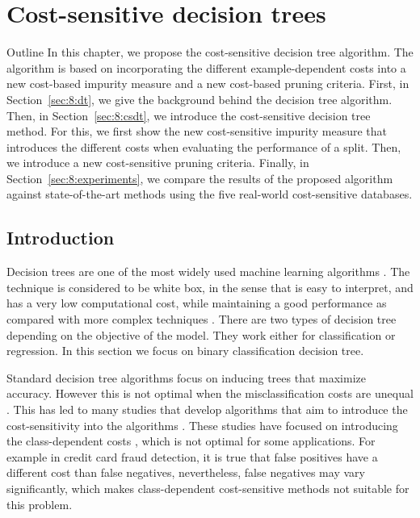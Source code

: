 \chapter{Cost-sensitive decision trees}\label{ch:8}

\begin{remark}{Outline}
In this chapter, we propose the cost-sensitive decision tree algorithm. The algorithm is 
based on incorporating the different example-dependent costs into a new cost-based impurity measure 
and a new cost-based pruning criteria. First, in Section~\ref{sec:8:dt}, we give the background 
behind the decision tree algorithm. Then, in Section~\ref{sec:8:csdt}, we introduce the 
cost-sensitive decision tree method. For this, we first show the new cost-sensitive impurity 
measure that introduces the different costs when evaluating the performance of a split. Then, we 
introduce a new cost-sensitive pruning criteria. Finally, in Section~\ref{sec:8:experiments}, we 
compare the results of the proposed algorithm against state-of-the-art methods using the five 
real-world cost-sensitive databases.
\end{remark}


\section{Introduction}
\label{sec:8:intro}

Decision trees are one of the most widely used machine learning algorithms \citep{Lior2008}. 
The technique is considered to be white box, in the sense that is easy to interpret, and has a 
very low computational cost, while maintaining a good performance as compared with more complex 
techniques \citep{Hastie2009}. There are two types of decision tree depending on the objective of 
the model. They work either for classification or regression. In this section we focus on
binary classification decision tree.

Standard decision tree algorithms focus on inducing trees that maximize accuracy. However this is 
not optimal when the misclassification costs are unequal \citep{Elkan2001}. This has led to many 
studies that develop algorithms that aim to introduce the cost-sensitivity into the algorithms 
\citep{Lomax2013}. These studies have focused on introducing the class-dependent costs  
\citep{Draper1994,Ting2002,Ling2004,Li2005,Kretowski2006,Vadera2010}, which is not optimal for 
some applications. For example in credit card fraud detection, it is true that false positives 
have a different cost than false negatives, nevertheless, false negatives may vary significantly, 
which makes class-dependent cost-sensitive methods not suitable for this problem.


